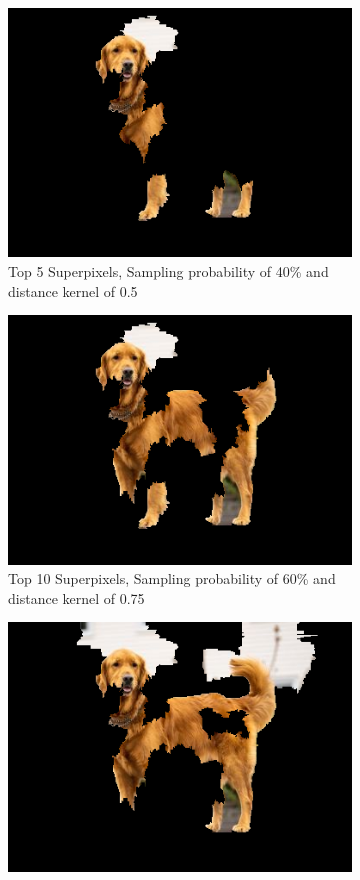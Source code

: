 \begin{figure}
    \captionsetup{justification=centering}

    \begin{subfigure}[t]{0.32\textwidth}
        \captionsetup{justification=centering}
        \centering
        \includegraphics[width=.7\linewidth]{figuras/lime/experiments/dog/lime_dog_sp0.4_dk0.5_nc5.png}
        \caption{Top 5 Superpixels, Sampling probability of 40\% and distance kernel of 0.5}
    \end{subfigure}
    \hfill
    \begin{subfigure}[t]{0.32\textwidth}
        \captionsetup{justification=centering}
        \centering
        \includegraphics[width=.7\linewidth]{figuras/lime/experiments/dog/lime_dog_sp0.6_dk0.75_nc10.png}
        \caption{Top 10 Superpixels, Sampling probability of 60\% and distance kernel of 0.75}
    \end{subfigure}
    \hfill
    \begin{subfigure}[t]{0.32\textwidth}
        \captionsetup{justification=centering}
        \centering
        \includegraphics[width=.7\linewidth]{figuras/lime/experiments/dog/lime_dog_sp0.8_dk1_nc15.png}

\end{subfigure}
\end{figure}
